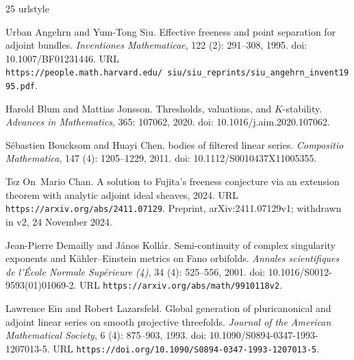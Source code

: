 \begin{thebibliography}{25}
\providecommand{\natexlab}[1]{#1}
\providecommand{\url}[1]{\texttt{#1}}
\expandafter\ifx\csname urlstyle\endcsname\relax
  \providecommand{\doi}[1]{doi: #1}\else
  \providecommand{\doi}{doi: \begingroup \urlstyle{rm}\Url}\fi

Urban Angehrn and Yum-Tong Siu.
\newblock Effective freeness and point separation for adjoint bundles.
\newblock \emph{Inventiones Mathematicae}, 122 (2): 291--308, 1995.
\newblock \doi{10.1007/BF01231446}.
\newblock URL \url{https://people.math.harvard.edu/~siu/siu_reprints/siu_angehrn_invent1995.pdf}.

Harold Blum and Mattias Jonsson.
\newblock Thresholds, valuations, and {$K$}-stability.
\newblock \emph{Advances in Mathematics}, 365: 107062, 2020.
\newblock \doi{10.1016/j.aim.2020.107062}.

S{\'e}bastien Boucksom and Huayi Chen.
 bodies of filtered linear series.
\newblock \emph{Compositio Mathematica}, 147 (4): 1205--1229, 2011.
\newblock \doi{10.1112/S0010437X11005355}.

Tsz On~Mario Chan.
\newblock A solution to {Fujita}'s freeness conjecture via an extension theorem with analytic adjoint ideal sheaves, 2024.
\newblock URL \url{https://arxiv.org/abs/2411.07129}.
\newblock Preprint, arXiv:2411.07129v1; withdrawn in v2, 24 November 2024.

Jean-Pierre Demailly and J{\'a}nos Koll{\'a}r.
\newblock Semi-continuity of complex singularity exponents and {K{\"a}hler--Einstein} metrics on {Fano} orbifolds.
\newblock \emph{Annales scientifiques de l'\'Ecole Normale Sup\'erieure (4)}, 34 (4): 525--556, 2001.
\newblock \doi{10.1016/S0012-9593(01)01069-2}.
\newblock URL \url{https://arxiv.org/abs/math/9910118v2}.

Lawrence Ein and Robert Lazarsfeld.
\newblock Global generation of pluricanonical and adjoint linear series on smooth projective threefolds.
\newblock \emph{Journal of the American Mathematical Society}, 6 (4): 875--903, 1993.
\newblock \doi{10.1090/S0894-0347-1993-1207013-5}.
\newblock URL \url{https://doi.org/10.1090/S0894-0347-1993-1207013-5}.


\end{thebibliography}

